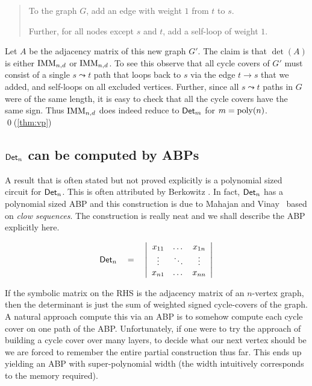\begin{quote}
  To the graph $G$, add an edge with weight $1$ from $t$ to $s$. 

  Further, for all nodes except $s$ and $t$, add a self-loop of weight $1$. 
\end{quote}

Let $A$ be the adjacency matrix of this new graph $G'$. The claim is that $\det(A)$ is either $\mathrm{IMM}_{n,d}$ or $\mathrm{IMM}_{n,d}$. To see this observe that all cycle covers of $G'$ must consist of a single $s\leadsto t$ path that loops back to $s$ via the edge $t\rightarrow s$ that we added, and self-loops on all excluded vertices. Further, since all $s\leadsto t$ paths in $G$ were of the same length, it is easy to check that all the cycle covers have the same sign. Thus $\mathrm{IMM}_{n,d}$ does indeed reduce to $\mathsf{Det}_m$ for $m = \mathrm{poly}(n)$. \qed {\footnotesize (\autoref{thm:vp})}\\


\subsection{$\mathsf{Det}_n$ can be computed by ABPs}

A result that is often stated but not proved explicitly is a polynomial sized circuit for $\mathsf{Det}_n$. This is often attributed by Berkowitz \cite{Berk84}. In fact, $\mathsf{Det}_n$ has a polynomial sized ABP and this construction is due to Mahajan and Vinay~\cite{mv97} based on \emph{clow sequences}. The construction is really neat and we shall describe the ABP explicitly here. 

\[
\mathsf{Det}_n \quad = \quad \left|\begin{array}{ccc}
x_{11} & \dots & x_{1n}\\
\vdots & \ddots & \vdots \\
x_{n1} & \dots & x_{nn}
\end{array}
\right|\]

If the symbolic matrix on the RHS is the adjacency matrix of an $n$-vertex graph, then the determinant is just the sum of weighted signed cycle-covers of the graph. A natural approach compute this via an ABP is to somehow compute each cycle cover on one path of the ABP. Unfortunately, if one were to try the \naive approach of building a cycle cover over many layers, to decide what our next vertex should be we are forced to remember the entire partial construction thus far. This ends up yielding an ABP with super-polynomial width (the width intuitively corresponds to the memory required). 


